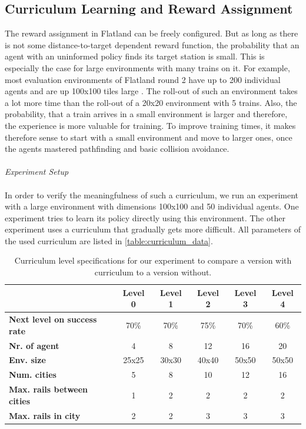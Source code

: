 \subsection*{Curriculum Learning and Reward Assignment}\label{curriculum_learning}
The reward assignment in Flatland can be freely configured. But as long as there is not some distance-to-target dependent reward function, the probability that an agent with an uninformed policy finds its target station is small. This is especially the case for large environments with many trains on it. For example, most evaluation environments of Flatland round 2 have up to 200 individual agents and are up 100x100 tiles large \cite{flatland_faq}. The roll-out of such an environment takes a lot more time than the roll-out of a 20x20 environment with 5 trains. Also, the probability, that a train arrives in a small environment is larger and therefore, the experience is more valuable for training.
To improve training times, it makes therefore sense to start with a small environment and move to larger ones, once the agents mastered pathfinding and basic collision avoidance.\\\\
\textit{Experiment Setup}\\\\
In order to verify the meaningfulness of such a curriculum, we run an experiment with a large environment with dimensions 100x100 and 50 individual agents. One experiment tries to learn its policy directly using this environment. The other experiment uses a curriculum that gradually gets more difficult. All parameters of the used curriculum are listed in \autoref{table:curriculum_data}.
\begin{table}[H]
	\centering
	\begin{tabular}{ |l|c|c|c|c|c| }
		\hline
		& \textbf{Level 0}
		& \textbf{Level 1}
		& \textbf{Level 2}
		& \textbf{Level 3}
		& \textbf{Level 4}\\
		\hline
		\textbf{Next level on success rate} & 70\% & 70\% & 75\% & 70\% & 60\% \\
		\textbf{Nr. of agent} & 4 & 8 & 12 & 16 & 20 \\
		\textbf{Env. size} & 25x25 & 30x30  & 40x40 & 50x50 & 50x50 \\
		\textbf{Num. cities} & 5 & 8 & 10  & 12 & 16 \\
		\textbf{Max. rails between cities} & 1 & 2 & 2 & 2 & 2  \\
		\textbf{Max. rails in city} & 2 & 2 & 3 & 3 & 3  \\
		\hline
	\end{tabular}
	\caption{Curriculum level specifications for our experiment to compare a version with curriculum to a version without.}
	\label{table:curriculum_data}
\end{table}
